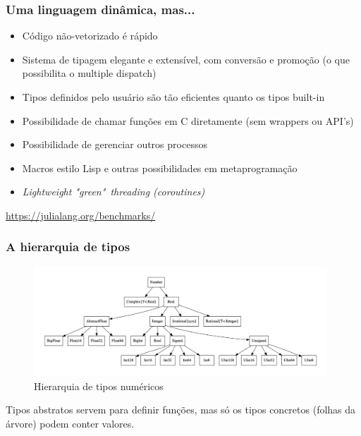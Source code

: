 \documentclass{beamer}
\begin{document}
\begin{frame}
	\frametitle{Uma linguagem dinâmica, mas...}
    \begin{itemize}
		\item Código não-vetorizado é rápido
        \item Sistema de tipagem elegante e extensível, com conversão e promoção (o que possibilita o multiple dispatch)
        \item Tipos definidos pelo usuário são tão eficientes quanto os tipos built-in
		\item Possibilidade de chamar funções em C diretamente (sem wrappers ou API's)
		\item Possibilidade de gerenciar outros processos
        \item Macros estilo Lisp e outras possibilidades em metaprogramação
	    \item \emph{Lightweight "green"\ threading (coroutines)}
    \end{itemize}
        \begin{alertblock}{}
    	\begin{center}
			\url{https://julialang.org/benchmarks/}
        \end{center}
    \end{alertblock}
\end{frame}

\begin{frame}
	\frametitle{A hierarquia de tipos}
    
    \begin{center}
    \begin{figure}
		\includegraphics[width=11cm]{Type-hierarchy-for-julia-numbers.png}
        \caption{Hierarquia de tipos numéricos}
    \end{figure}
    \end{center}
    Tipos abstratos servem para definir funções, mas só os tipos concretos (folhas da árvore) podem conter valores.
\end{frame}
\end{document}
